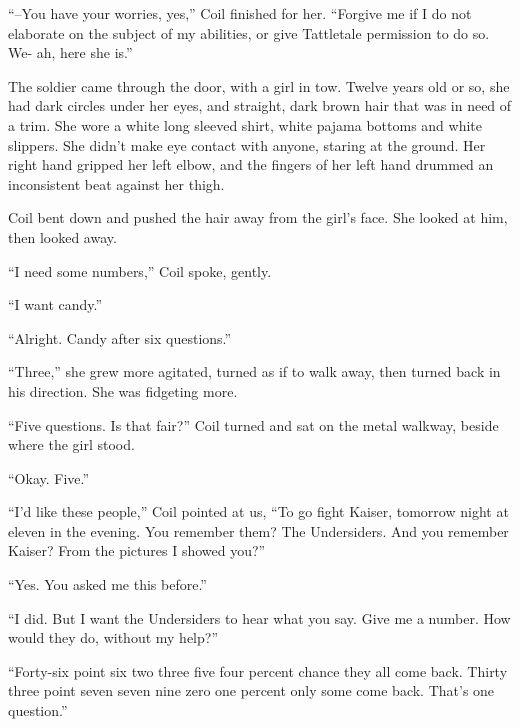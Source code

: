 ``--You have your worries, yes,'' Coil finished for her.  ``Forgive me if I do not elaborate on the subject of my abilities, or give Tattletale permission to do so.  We- ah, here she is.''



The soldier came through the door, with a girl in tow.  Twelve years old or so, she had dark circles under her eyes, and straight, dark brown hair that was in need of a trim.  She wore a white long sleeved shirt, white pajama bottoms and white slippers.  She didn't make eye contact with anyone, staring at the ground.  Her right hand gripped her left elbow, and the fingers of her left hand drummed an inconsistent beat against her thigh.



Coil bent down and pushed the hair away from the girl's face.  She looked at him, then looked away.



``I need some numbers,'' Coil spoke, gently.



``I want candy.''



``Alright.  Candy after six questions.''



``Three,'' she grew more agitated, turned as if to walk away, then turned back in his direction.  She was fidgeting more.



``Five questions.  Is that fair?''  Coil turned and sat on the metal walkway, beside where the girl stood.



``Okay.  Five.''



``I'd like these people,'' Coil pointed at us, ``To go fight Kaiser, tomorrow night at eleven in the evening.  You remember them?  The Undersiders.  And you remember Kaiser?  From the pictures I showed you?''



``Yes.  You asked me this before.''



``I did.  But I want the Undersiders to hear what you say.  Give me a number.  How would they do, without my help?''



``Forty-six point six two three five four percent chance they all come back.  Thirty three point seven seven nine zero one percent only some come back.  That's one question.''



